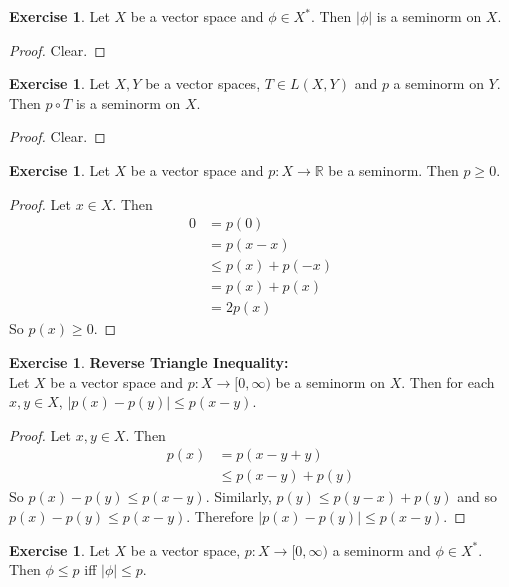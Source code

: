 \documentclass[12pt]{amsart}
\theoremstyle{definition}
\newtheorem{ex}[definition]{Exercise}
\newcommand{\R}{\mathbb{R}}
\newcommand{\Rg}{[0,\infty)}
\newcommand{\lex}[1]{\label{ex:#1}}
\begin{document}
	\begin{ex}
		Let $X$ be a vector space and $\phi \in X^*$. Then $|\phi|$ is a seminorm on $X$.
	\end{ex}
	
	\begin{proof}
		Clear.
	\end{proof}

	\begin{ex}
		Let $X,Y$ be a vector spaces, $T \in L(X, Y)$ and $p$ a seminorm on $Y$. Then $p \circ T$ is a seminorm on $X$.
	\end{ex}
	
	\begin{proof}
		Clear.
	\end{proof}
	
	\begin{ex} \lex{55007}
		Let $X$ be a vector space and $p: X \rightarrow \R$ be a seminorm. Then $p \geq 0$. 
	\end{ex}
	
	\begin{proof}
		Let $x \in X$. Then 
		\begin{align*}
			0 
			&= p(0) \\ 
			&= p(x - x) \\
			&\leq  p(x) + p(-x) \\
			&= p(x) + p(x) \\
			&= 2p(x)
		\end{align*}
		So $p(x) \geq 0$.
	\end{proof}

	\begin{ex} \textbf{Reverse Triangle Inequality:} \\
		Let $X$ be a vector space and $p:X \rightarrow \Rg$ be a seminorm on $X$. Then for each $x ,y \in X$, $|p(x) - p(y)| \leq p(x - y)$.  
	\end{ex}
	
	\begin{proof}
		Let $x, y \in X$. Then 
		\begin{align*}
			p(x)
			&= p(x -y + y) \\
			&\leq p(x - y) + p(y) 
		\end{align*}
		So $p(x) - p(y) \leq p(x - y)$. 
		Similarly, $p(y) \leq p(y - x) + p(y)$ and so $p(x) - p(y) \leq p(x - y)$. Therefore $|p(x) - p(y)| \leq p(x - y)$.
	\end{proof}
	
	\begin{ex}
		Let $X$ be a vector space, $p: X \rightarrow \Rg$ a seminorm and $\phi \in X^*$. Then $\phi \leq p$ iff $|\phi| \leq p$. 
	\end{ex}
	
\end{document}
